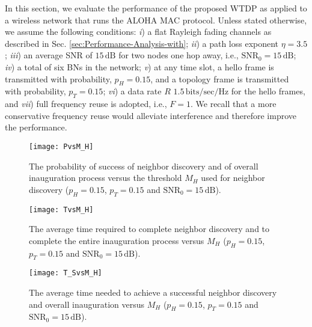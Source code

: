 \documentclass[10pt,english,two column]{IEEEtran}
\begin{document}
In this section, we evaluate the performance of the proposed WTDP
as applied to a wireless network that runs the ALOHA MAC protocol.
Unless stated otherwise, we assume the following conditions: \textit{i})
a flat Rayleigh fading channels as described in Sec. \ref{sec:Performance-Analysis-with};
\textit{ii}) a path loss exponent $\eta=3.5$; \textit{iii}) an average
SNR of $15\,\mathrm{dB}$ for two nodes one hop away, i.e., $\mathrm{SN}\mathrm{R}_{0}=15\,\mathrm{dB}$;
\textit{iv}) a total of six BNs in the network; \textit{v}) at any
time slot, a hello frame is transmitted with probability, $p_{H}=0.15$,
and a topology frame is transmitted with probability, $p_{T}=0.15$;
\textit{vi}) a data rate $R$ $1.5\,\mathrm{bits/sec/Hz}$ for the
hello frames, and \textit{vii}) full frequency reuse is adopted, i.e.,
$F=1$. We recall that a more conservative frequency reuse would alleviate
interference and therefore improve the performance. 
\begin{figure}[h]
\begin{centering}
\textsf{\texttt{[image: PvsM\_H]}}
\par\end{centering}

\caption{\label{fig: PvsM_H}The probability of success of neighbor discovery
and of overall inauguration process versus the threshold $M_{H}$
used for neighbor discovery ($p_{H}=0.15$, $p_{T}=0.15$ and $\mathrm{SN}\mathrm{R}_{0}=15\,\mathrm{dB}$).}
\end{figure}
\begin{figure}[h]
\begin{centering}
\textsf{\texttt{[image: TvsM\_H]}}
\par\end{centering}

\caption{\label{fig: TvsM_H}The average time required to complete neighbor
discovery and to complete the entire inauguration process versus $M_{H}$
($p_{H}=0.15$, $p_{T}=0.15$ and $\mathrm{SN}\mathrm{R}_{0}=15\,\mathrm{dB}$).}
\end{figure}
\begin{figure}[h]
\begin{centering}
\textsf{\texttt{[image: T\_SvsM\_H]}}
\par\end{centering}

\caption{\label{fig: T_SvsM_H}The average time needed to achieve a successful
neighbor discovery and overall inauguration versus $M_{H}$ ($p_{H}=0.15$,
$p_{T}=0.15$ and $\mathrm{SN}\mathrm{R}_{0}=15\,\mathrm{dB}$).}
\end{figure}
\end{document}
